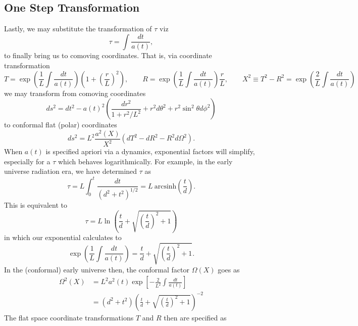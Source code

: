 \documentclass[10pt,letterpaper]{article}
\begin{document}
\subsection*{One Step Transformation}
Lastly, we may substitute the transformation of $\tau$ viz
\begin{equation}
\tau = \int\frac{dt}{a(t)},
\end{equation}
to finally bring us to comoving coordinates. That is, via coordinate transformation
\begin{equation}
T = \exp\left(\frac{1}{L}\int\frac{dt}{a(t)}\right)\left( 1+ \left(\frac{r}{L}\right)^2\right),\qquad R = \exp\left(\frac{1}{L}\int\frac{dt}{a(t)}\right)\frac{r}{L},\qquad X^2 \equiv T^2-R^2 = \exp\left(\frac{2}{L}\int\frac{dt}{a(t)}\right)
\end{equation}
we may transform from comoving coordinates 
\begin{equation}
ds^2 = dt^2 - a(t)^2 \left(  \frac{dr^2}{1+r^2/L^2} + r^2 d\theta^2 + r^2\sin^2\theta d\phi^2 \right)
\end{equation}
to conformal flat (polar) coordinates
\begin{equation}
ds^2 = L^2\frac{a^2(X)}{X^2} \left( dT^2 - dR^2 - R^2 d\Omega^2\right).
\end{equation}
When $a(t)$ is specified apriori via a dynamics, exponential factors will simplify, especially for a $\tau$ which behaves logarithmically. For example, in the early universe radiation era, we have determined $\tau$ as
\begin{equation}
\tau = L \int_0^t \frac{dt}{(d^2+t^2)^{1/2}} = L\  \text{arcsinh} \left(\frac{t}{d}\right).
\end{equation}
This is equivalent to 
\begin{equation}
\tau =L \ln \left( \frac{t}{d} + \sqrt{\left(\frac{t}{d}\right)^2 + 1}\right)
\end{equation}
in which our exponential calculates to 
\begin{equation}
\exp\left(\frac{1}{L}\int\frac{dt}{a(t)}\right) = \frac{t}{d} + \sqrt{\left(\frac{t}{d}\right)^2 + 1}.
\end{equation}
In the (conformal) early universe then, the conformal factor $\Omega(X)$ goes as
\begin{align}
\Omega^2(X) &= L^2 a^2(t) \exp\left[{-\frac{2}{L^2}\int\frac{dt}{a(t)}}\right] \\
&= (d^2+t^2)\left(\frac{t}{d} + \sqrt{\left(\frac{t}{d}\right)^2 + 1}\right)^{-2}
\end{align}
The flat space coordinate transformations $T$ and $R$ then are specified as
\end{document}
